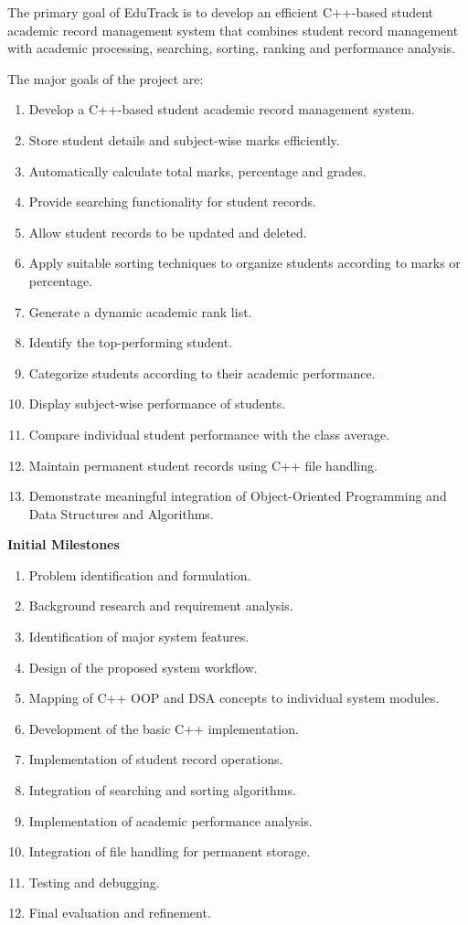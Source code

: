 \documentclass[11pt,a4paper]{article}
\begin{document}
\vspace{3mm}
\begin{answerbox}
The primary goal of EduTrack is to develop an efficient C++-based student academic record management system that combines student record management with academic processing, searching, sorting, ranking and performance analysis.

The major goals of the project are:
\begin{enumerate}[leftmargin=7mm,itemsep=1.5pt,topsep=2pt,parsep=0pt]
\item Develop a C++-based student academic record management system.
\item Store student details and subject-wise marks efficiently.
\item Automatically calculate total marks, percentage and grades.
\item Provide searching functionality for student records.
\item Allow student records to be updated and deleted.
\item Apply suitable sorting techniques to organize students according to marks or percentage.
\item Generate a dynamic academic rank list.
\item Identify the top-performing student.
\item Categorize students according to their academic performance.
\item Display subject-wise performance of students.
\item Compare individual student performance with the class average.
\item Maintain permanent student records using C++ file handling.
\item Demonstrate meaningful integration of Object-Oriented Programming and Data Structures and Algorithms.
\end{enumerate}

\textbf{Initial Milestones}
\begin{enumerate}[leftmargin=7mm,itemsep=1.5pt,topsep=2pt,parsep=0pt]
\item Problem identification and formulation.
\item Background research and requirement analysis.
\item Identification of major system features.
\item Design of the proposed system workflow.
\item Mapping of C++ OOP and DSA concepts to individual system modules.
\item Development of the basic C++ implementation.
\item Implementation of student record operations.
\item Integration of searching and sorting algorithms.
\item Implementation of academic performance analysis.
\item Integration of file handling for permanent storage.
\item Testing and debugging.
\item Final evaluation and refinement.
\end{enumerate}
\end{answerbox}
\end{document}
